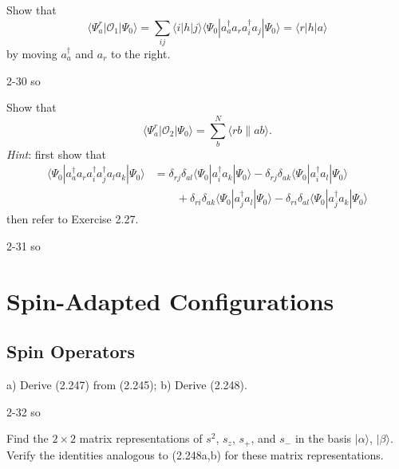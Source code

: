 \documentclass[a4paper]{book}
\newcommand\lr[2]{\langle#1\|#2\rangle}
\begin{document}
	\begin{exercise}
	Show that
	\[
		\langle \Psi^r_a | \mathscr{O}_1 | \Psi_0 \rangle = \sum_{ij} \langle i | h | j \rangle \langle \Psi_0 | a^\dagger_a a_r a^\dagger_i a_j | \Psi_0 \rangle = \langle r | h | a \rangle
	\]
	by moving $a^\dagger_a$ and $a_r$ to the right.
	\end{exercise}
	
	\begin{solution}
		2-30 so
	\end{solution}
	
	\begin{exercise}
	Show that
	\[
		\langle \Psi^r_a | \mathscr{O}_2 | \Psi_0 \rangle = \sum_b^N \lr{rb}{ab}.
	\]
	{\it Hint}: first show that
	\begin{align*}
		\langle \Psi_0 | a^\dagger_a a_r a^\dagger_i a^\dagger_j a_l a_k | \Psi_0 \rangle &= \delta_{rj} \delta_{al} \langle \Psi_0 | a^\dagger_i a_k | \Psi_0 \rangle - \delta_{rj} \delta_{ak} \langle \Psi_0 | a^\dagger_i a_l | \Psi_0 \rangle \\
		&\hspace{2em} + \delta_{ri} \delta_{ak} \langle \Psi_0 | a^\dagger_j a_l | \Psi_0 \rangle - \delta_{ri} \delta_{al} \langle \Psi_0 | a^\dagger_j a_k | \Psi_0 \rangle
	\end{align*}
	then refer to Exercise 2.27.
	\end{exercise}
	
	\begin{solution}
		2-31 so
	\end{solution}
	
	\section{Spin-Adapted Configurations}
	
	\subsection{Spin Operators}
	
	\begin{exercise}
	a) Derive (2.247) from (2.245); b) Derive (2.248).
	\end{exercise}
	
	\begin{solution}
		2-32 so
	\end{solution}
	
	\begin{exercise}
	Find the $2 \times 2$ matrix representations of $s^2$, $s_z$, $s_+$, and $s_-$ in the basis $|\alpha\rangle$, $|\beta\rangle$. Verify the identities analogous to (2.248a,b) for these matrix representations.
	\end{exercise}
	
\end{document}

